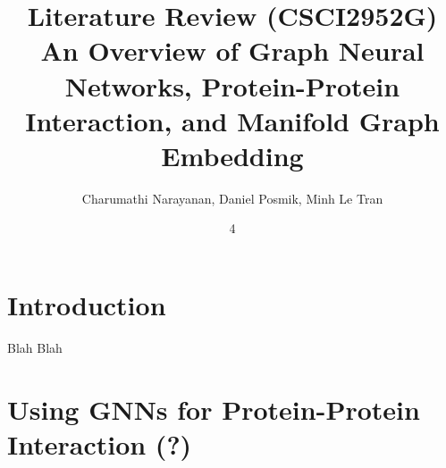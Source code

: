 \documentclass[twoside,11pt]{article}
\begin{document}
\title{	Literature Review (CSCI2952G) \\
\vspace{.1in}
An Overview of Graph Neural Networks, Protein-Protein Interaction, and Manifold Graph Embedding 	
}

\author{Charumathi Narayanan, Daniel Posmik, Minh Le Tran}

\maketitle
\date{4 }

\section{Introduction} \label{sec:intro}

Blah Blah 

\section{Using GNNs for Protein-Protein Interaction (?)} \label{sec:application}

\citet{jha_etal_2022}
\end{document}
